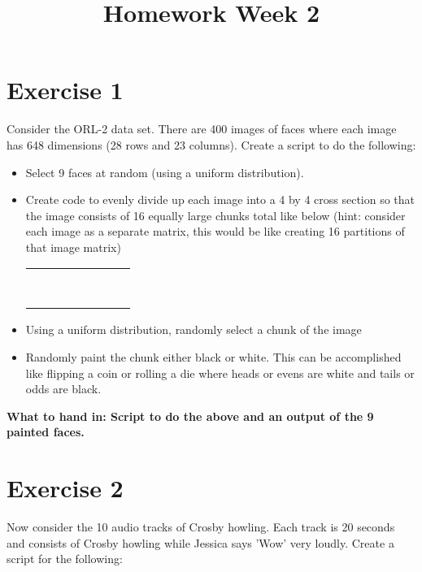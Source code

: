 \documentclass[a4paper]{article}
\begin{document}
\title{Homework Week 2}
\date{}
\maketitle

\section{Exercise 1}
Consider the ORL-2 data set. There are 400 images of faces where each image has 648 dimensions (28 rows and 23 columns). Create a script to do the following:
\begin{itemize}
\item Select 9 faces at random (using a uniform distribution). 
\item Create code to evenly divide up each image into a 4 by 4 cross section so that the image consists of 16 equally large chunks total like below (hint: consider each image as a separate matrix, this would be like creating 16 partitions of that image matrix) \begin{table}[h]
\centering
\begin{tabular}{|ll|ll|ll|ll|}\hline
 &  &  &  &  &  &  &  \\
 &  &  &  &  &  &  &  \\\hline
 &  &  &  &  &  &  &  \\
 &  &  &  &  &  &  &  \\ \hline
 &  &  &  &  &  &  &  \\
 &  &  &  &  &  &  &  \\ \hline
 &  &  &  &  &  &  &  \\
 &  &  &  &  &  &  &  \\\hline
\end{tabular}
\end{table}
\item Using a uniform distribution, randomly select a chunk of the image
\item Randomly paint the chunk either black or white. This can be accomplished like flipping a coin or rolling a die where heads or evens are white and tails or odds are black.
\end{itemize}

\textbf{What to hand in: Script to do the above and an output of the 9 painted faces. }


\section{Exercise 2}
Now consider the 10 audio tracks of Crosby howling. Each track is 20 seconds and consists of Crosby howling while Jessica says 'Wow' very loudly. Create a script for the following:
\end{document}
